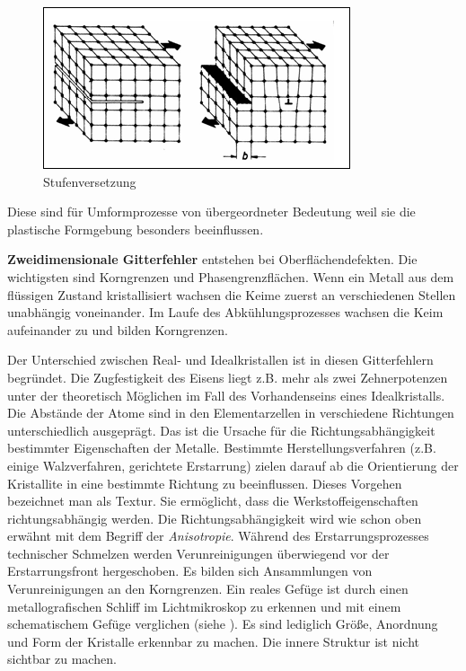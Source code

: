 \documentclass[12pt,a4paper,parskip,twoside,BCOR5mm,headsepline]{scrartcl}
\begin{document}
\begin{description*}
{\begin{enumerate*}
\begin{figure}
\centering
\includegraphics[width=.8\textwidth]{versetzung}
\caption[Stufenversetzung]{Stufenversetzung \autocite[50]{wk}}
\label{fig:versetzung}
\end{figure}

 Diese sind für Umformprozesse von übergeordneter Bedeutung weil sie die plastische Formgebung besonders beeinflussen.
\item \textbf{Zweidimensionale Gitterfehler} entstehen bei Oberflächendefekten. Die wichtigsten sind Korngrenzen und Phasengrenzflächen. Wenn ein Metall aus dem flüssigen Zustand kristallisiert wachsen die Keime zuerst an verschiedenen Stellen unabhängig voneinander. Im Laufe des Abkühlungsprozesses wachsen die Keim aufeinander zu und bilden Korngrenzen.
\end{enumerate*}

Der Unterschied zwischen Real- und Idealkristallen ist in diesen Gitterfehlern begründet. Die Zugfestigkeit des Eisens liegt  z.B. mehr als zwei Zehnerpotenzen unter der theoretisch Möglichen im Fall des Vorhandenseins eines Idealkristalls. Die Abstände der Atome sind in den Elementarzellen in verschiedene Richtungen unterschiedlich ausgeprägt. Das ist die Ursache für die Richtungsabhängigkeit bestimmter Eigenschaften der Metalle. Bestimmte Herstellungsverfahren (z.B. einige Walzverfahren, gerichtete Erstarrung) zielen darauf ab die Orientierung der Kristallite in eine bestimmte Richtung zu beeinflussen. Dieses Vorgehen bezeichnet man als Textur. Sie ermöglicht, dass die Werkstoffeigenschaften richtungsabhängig werden.  Die Richtungsabhängigkeit wird wie schon oben erwähnt mit dem Begriff der \emph{Anisotropie}. 
Während des Erstarrungsprozesses technischer Schmelzen werden Verunreinigungen überwiegend vor der Erstarrungsfront hergeschoben. Es bilden sich Ansammlungen von Verunreinigungen an den Korngrenzen. Ein reales Gefüge ist durch einen metallografischen Schliff im Lichtmikroskop zu erkennen und mit einem schematischem Gefüge verglichen (siehe ). Es sind lediglich Größe, Anordnung und Form der Kristalle erkennbar zu machen. Die innere Struktur ist nicht sichtbar zu machen. \autocite[3-6]{fu}

}
\end{description*}
\end{document}
